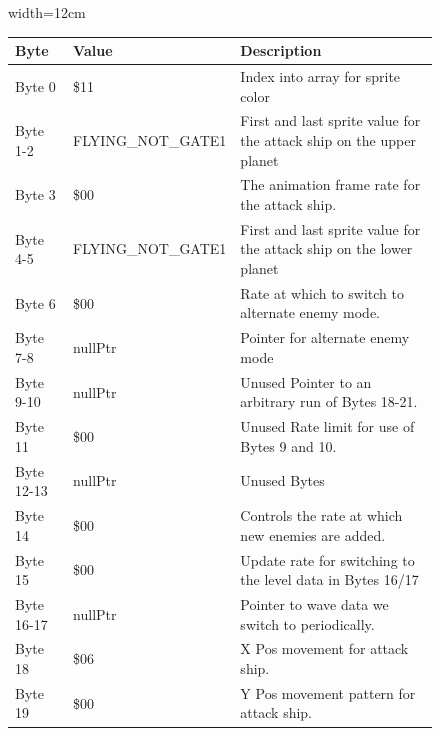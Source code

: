 \begin{figure}[H]
  {
  \setlength{\tabcolsep}{3.0pt}
  \setlength\cmidrulewidth{\heavyrulewidth} %
  \begin{adjustbox}{width=12cm}

\begin{tabular}{lll}
\toprule
 Byte       & Value                     & Description                                                         \\
\midrule
 Byte 0     & \$11                       & Index into array for sprite color                                   \\
 Byte 1-2   & FLYING\_NOT\_GATE1          & First and last sprite value for the attack ship on the upper planet \\
 Byte 3     & \$00                       & The animation frame rate for the attack ship.                       \\
 Byte 4-5   & FLYING\_NOT\_GATE1          & First and last sprite value for the attack ship on the lower planet \\
 Byte 6     & \$00                       & Rate at which to switch to alternate enemy mode.                    \\
 Byte 7-8   & nullPtr                   & Pointer for alternate enemy mode                                    \\
 Byte 9-10  & nullPtr                   & Unused Pointer to an arbitrary run of Bytes 18-21.                  \\
 Byte 11    & \$00                       & Unused Rate limit for use of Bytes 9 and 10.                        \\
 Byte 12-13 & nullPtr                   & Unused Bytes                                                        \\
 Byte 14    & \$00                       & Controls the rate at which new enemies are added.                   \\
 Byte 15    & \$00                       & Update rate for switching to the level data in Bytes 16/17          \\
 Byte 16-17 & nullPtr                   & Pointer to wave data we switch to periodically.                     \\
 Byte 18    & \$06                       & X Pos movement for attack ship.                                     \\
 Byte 19    & \$00                       & Y Pos movement pattern for attack ship.                             \\

\end{tabular}
\end{adjustbox}}
\end{figure}
